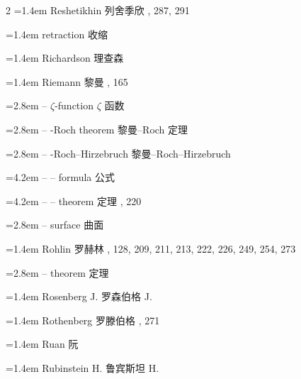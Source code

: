 \begin{multicols}{2}
\noindent\hangindent=1.4em Reshetikhin \quad 列舍季欣 , 287, 291\par
\noindent\hangindent=1.4em retraction \quad 收缩 \par
\noindent\hangindent=1.4em Richardson \quad 理查森 \par
\noindent\hangindent=1.4em Riemann \quad 黎曼 , 165\par
\noindent\hangindent=2.8em -- $\zeta$-function \quad $\zeta$ 函数 \par
\noindent\hangindent=2.8em -- -Roch theorem \quad 黎曼--Roch 定理 \par
\noindent\hangindent=2.8em -- -Roch--Hirzebruch \quad 黎曼--Roch--Hirzebruch \quad\par
\noindent\hangindent=4.2em -- -- formula \quad 公式 \par
\noindent\hangindent=4.2em -- -- theorem \quad 定理 , 220\par
\noindent\hangindent=2.8em -- surface \quad 曲面 \par
\noindent\hangindent=1.4em Rohlin \quad 罗赫林 , 128, 209, 211, 213, 222, 226, 249, 254, 273\par
\noindent\hangindent=2.8em -- theorem \quad 定理 \par
\noindent\hangindent=1.4em Rosenberg J. \quad 罗森伯格 J. \par
\noindent\hangindent=1.4em Rothenberg \quad 罗滕伯格 , 271\par
\noindent\hangindent=1.4em Ruan \quad 阮 \par
\noindent\hangindent=1.4em Rubinstein H. \quad 鲁宾斯坦 H. \par
\end{multicols}

